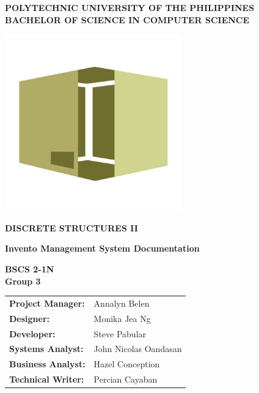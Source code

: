 \documentclass[12pt,a4paper]{article}
\begin{document}
\thispagestyle{empty}

\vspace*{\fill}
\begingroup
\centering

    \textbf{POLYTECHNIC UNIVERSITY OF THE PHILIPPINES\\
    BACHELOR OF SCIENCE IN COMPUTER SCIENCE}\vspace{.1in}

\noindent\includegraphics[width=3in,height=3in]{logo.png}\vspace{.1in}

    \textbf{DISCRETE STRUCTURES II}\vspace{.1in}
    
    \textbf{
        \huge Invento Management System Documentation
    }\vspace{2in}

\endgroup
\vspace*{\fill}

    \noindent\textbf{BSCS 2-1N\\Group 3}\vspace{0.2in}

    \noindent
    \begin{tabular}{l l}
        \textbf{Project Manager:} & Annalyn Belen \\
        \textbf{Designer:} & Monika Jea Ng\\
        \textbf{Developer:} & Steve Pabular \\
        \textbf{Systems Analyst:} & John Nicolas Oandasan\\
        \textbf{Business Analyst:} & Hazel Conception\\
        \textbf{Technical Writer:} & Percian Cayaban
    \end{tabular}\vspace{0.2in}
\end{document}

